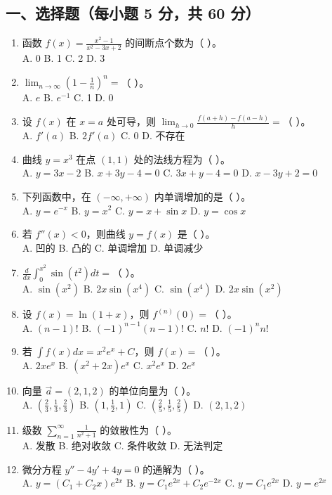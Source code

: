 \documentclass[11pt,a4paper]{article}
\begin{document}
\subsection*{一、选择题（每小题 5 分，共 60 分）}
\begin{enumerate}
    \item 函数 $f(x) = \frac{x^2-1}{x^2-3x+2}$ 的间断点个数为（ ）。 \\
    A. 0 \quad B. 1 \quad C. 2 \quad D. 3
    \item $\lim_{n \to \infty} \left( 1 - \frac{1}{n} \right)^n = $（ ）。 \\
    A. $e$ \quad B. $e^{-1}$ \quad C. 1 \quad D. 0
    \item 设 $f(x)$ 在 $x=a$ 处可导，则 $\lim_{h \to 0} \frac{f(a+h) - f(a-h)}{h} = $（ ）。 \\
    A. $f'(a)$ \quad B. $2f'(a)$ \quad C. 0 \quad D. 不存在
    \item 曲线 $y = x^3$ 在点 $(1,1)$ 处的法线方程为（ ）。 \\
    A. $y = 3x-2$ \quad B. $x+3y-4=0$ \quad C. $3x+y-4=0$ \quad D. $x-3y+2=0$
    \item 下列函数中，在 $(-\infty, +\infty)$ 内单调增加的是（ ）。 \\
    A. $y = e^{-x}$ \quad B. $y = x^2$ \quad C. $y = x + \sin x$ \quad D. $y = \cos x$
    \item 若 $f''(x) < 0$，则曲线 $y=f(x)$ 是（ ）。 \\
    A. 凹的 \quad B. 凸的 \quad C. 单调增加 \quad D. 单调减少
    \item $\frac{d}{dx} \int_0^{x^2} \sin(t^2) dt = $（ ）。 \\
    A. $\sin(x^2)$ \quad B. $2x \sin(x^4)$ \quad C. $\sin(x^4)$ \quad D. $2x \sin(x^2)$
    \item 设 $f(x) = \ln(1+x)$，则 $f^{(n)}(0) = $（ ）。 \\
    A. $(n-1)!$ \quad B. $(-1)^{n-1}(n-1)!$ \quad C. $n!$ \quad D. $(-1)^n n!$
    \item 若 $\int f(x) dx = x^2 e^x + C$，则 $f(x) = $（ ）。 \\
    A. $2xe^x$ \quad B. $(x^2+2x)e^x$ \quad C. $x^2 e^x$ \quad D. $2e^x$
    \item 向量 $\vec{a}=(2,1,2)$ 的单位向量为（ ）。 \\
    A. $(\frac{2}{3}, \frac{1}{3}, \frac{2}{3})$ \quad B. $(1, \frac{1}{2}, 1)$ \quad C. $(\frac{2}{5}, \frac{1}{5}, \frac{2}{5})$ \quad D. $(2,1,2)$
    \item 级数 $\sum_{n=1}^{\infty} \frac{1}{n^2+1}$ 的敛散性为（ ）。 \\
    A. 发散 \quad B. 绝对收敛 \quad C. 条件收敛 \quad D. 无法判定
    \item 微分方程 $y'' - 4y' + 4y = 0$ 的通解为（ ）。 \\
    A. $y = (C_1+C_2 x)e^{2x}$ \quad B. $y = C_1 e^{2x} + C_2 e^{-2x}$ \quad C. $y = C_1 e^{2x}$ \quad D. $y = e^{2x}$
\end{enumerate}
\end{document}
